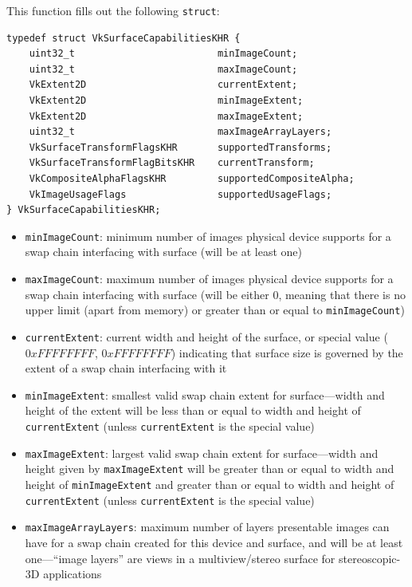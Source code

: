 \documentclass[12pt,letterpaper]{article}
\newcommand{\inquotes}[1]{``#1''}	%
\newcommand{\cil}[1]{\texttt{#1}}
\begin{document}
    This function fills out the following \cil{struct}:
        \begin{verbatim}
typedef struct VkSurfaceCapabilitiesKHR {
    uint32_t                         minImageCount;
    uint32_t                         maxImageCount;
    VkExtent2D                       currentExtent;
    VkExtent2D                       minImageExtent;
    VkExtent2D                       maxImageExtent;
    uint32_t                         maxImageArrayLayers;
    VkSurfaceTransformFlagsKHR       supportedTransforms;
    VkSurfaceTransformFlagBitsKHR    currentTransform;
    VkCompositeAlphaFlagsKHR         supportedCompositeAlpha;
    VkImageUsageFlags                supportedUsageFlags;
} VkSurfaceCapabilitiesKHR;
        \end{verbatim}
    \begin{itemize}
        \item \cil{minImageCount}: minimum number of images physical device supports for a swap chain interfacing with surface (will be at least one)
        
        \item \cil{maxImageCount}: maximum number of images physical device supports for a swap chain interfacing with surface (will be either 0, meaning that there is no upper limit (apart from memory) or greater than or equal to \cil{minImageCount}) 
        
        \item \cil{currentExtent}: current width and height of the surface, or special value ($0xFFFFFFFF$, $0xFFFFFFFF$) indicating that surface size is governed by the extent of a swap chain interfacing with it
        
        \item \cil{minImageExtent}: smallest valid swap chain extent for surface---width and height of the extent will be less than or equal to width and height of \cil{currentExtent} (unless \cil{currentExtent} is the special value)
        
        \item \cil{maxImageExtent}: largest valid swap chain extent for surface---width and height given by \cil{maxImageExtent} will be greater than or equal to width and height of \cil{minImageExtent} and greater than or equal to width and height of \cil{currentExtent} (unless \cil{currentExtent} is the special value)
        
        \item \cil{maxImageArrayLayers}: maximum number of layers presentable images can have for a swap chain created for this device and surface, and will be at least one---\inquotes{image layers} are views in a multiview/stereo surface for stereoscopic-3D applications
        

\end{itemize}
\end{document}
